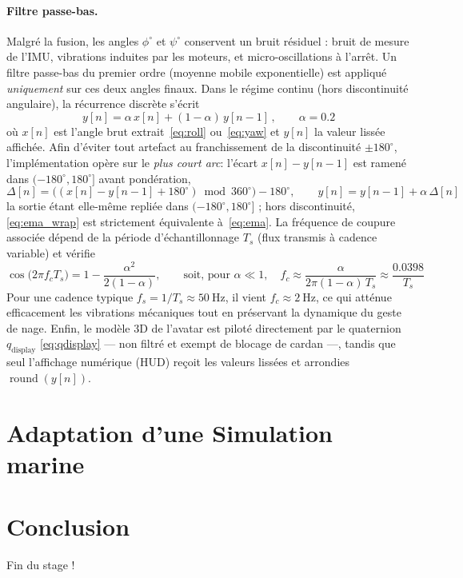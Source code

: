 \documentclass{tropLaClasse}
\begin{document}
\paragraph{Filtre passe-bas.}
Malgré la fusion, les angles $\phi^{\circ}$ et $\psi^{\circ}$ conservent un bruit résiduel : bruit de mesure de l'IMU, vibrations induites par les moteurs, et micro-oscillations à l'arrêt. Un filtre passe-bas du premier ordre (moyenne mobile exponentielle) est appliqué \emph{uniquement} sur ces deux angles finaux. Dans le régime continu (hors discontinuité angulaire), la récurrence discrète s'écrit
\begin{equation}
\boxed{\,y[n]=\alpha\,x[n]+(1-\alpha)\,y[n-1]\,},\qquad \alpha=0{.}2
\label{eq:ema}
\end{equation}
où $x[n]$ est l'angle brut extrait~\eqref{eq:roll} ou~\eqref{eq:yaw} et $y[n]$ la valeur lissée affichée. Afin d'éviter tout artefact au franchissement de la discontinuité $\pm180^\circ$, l'implémentation opère sur le \emph{plus court arc}: l'écart $x[n]-y[n-1]$ est ramené dans $(-180^\circ,180^\circ]$ avant pondération,
\begin{equation}
\Delta[n]=\big((x[n]-y[n-1]+180^\circ)\bmod 360^\circ\big)-180^\circ,
\qquad
y[n]=y[n-1]+\alpha\,\Delta[n]
\label{eq:ema_wrap}
\end{equation}
la sortie étant elle-même repliée dans $(-180^\circ,180^\circ]$ ; hors discontinuité, \eqref{eq:ema_wrap} est strictement équivalente à~\eqref{eq:ema}. La fréquence de coupure associée dépend de la période d'échantillonnage $T_s$ (flux transmis à cadence variable) et vérifie
\begin{equation}
\cos\!\big(2\pi f_c T_s\big)=1-\frac{\alpha^{2}}{2(1-\alpha)},
\qquad\text{soit, pour }\alpha\ll1,\quad
f_c\approx\frac{\alpha}{2\pi(1-\alpha)\,T_s}\approx\frac{0{.}0398}{T_s}
\end{equation}
Pour une cadence typique $f_s=1/T_s\approx50~\mathrm{Hz}$, il vient $f_c\approx2~\mathrm{Hz}$, ce qui atténue efficacement les vibrations mécaniques tout en préservant la dynamique du geste de nage. Enfin, le modèle 3D de l'avatar est piloté directement par le quaternion $q_{\text{display}}$ \eqref{eq:qdisplay} --- non filtré et exempt de blocage de cardan ---, tandis que seul l'affichage numérique (HUD) reçoit les valeurs lissées et arrondies $\operatorname{round}(y[n])$.


\section{Adaptation d'une Simulation marine}

\section{Conclusion}
Fin du stage !

\clearpage
\end{document}
